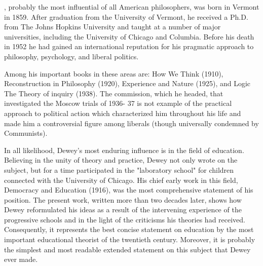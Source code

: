 , probably the most influential of all American philosophers, was born 
in Vermont in 1859. After graduation from the University of Vermont, he received a 
Ph.D. from The Johns Hopkins University and taught at a number of major universities, 
including the University of Chicago and Columbia. Before his death in 1952 he had 
gained an international reputation for his pragmatic approach to philosophy, psychology, 
and liberal politics. 

Among his important books in these areas are: How We Think (1910), Reconstruction 
in Philosophy (1920), Experience and Nature (1925), and Logic The Theory of inquiry 
(1938). The commission, which he headed, that investigated the Moscow trials of 1936- 
37 is not example of the practical approach to political action which characterized him 
throughout his life and made him a controversial figure among liberals (though 
universally condemned by Communists). 

In all likelihood, Dewey's most enduring influence is in the field of education. 
Believing in the unity of theory and practice, Dewey not only wrote on the subject, but 
for a time participated in the "laboratory school" for children connected with the 
University of Chicago. His chief early work in this field, Democracy and Education 
(1916), was the most comprehensive statement of his position. The present work, written 
more than two decades later, shows how Dewey reformulated his ideas as a result of the 
intervening experience of the progressive schools and in the light of the criticisms his 
theories had received. Consequently, it represents the best concise statement on education 
by the most important educational theorist of the twentieth century. Moreover, it is 
probably the simplest and most readable extended statement on this subject that Dewey 
ever made. 
